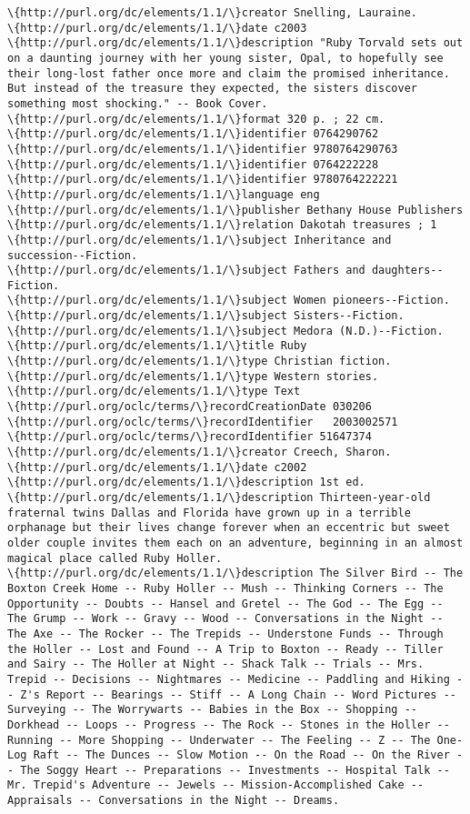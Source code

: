 \documentclass[11pt]{article}
\begin{document}
    \begin{Verbatim}[commandchars=\\\{\}]
\{http://purl.org/dc/elements/1.1/\}creator Snelling, Lauraine.
\{http://purl.org/dc/elements/1.1/\}date c2003
\{http://purl.org/dc/elements/1.1/\}description "Ruby Torvald sets out on a daunting journey with her young sister, Opal, to hopefully see their long-lost father once more and claim the promised inheritance. But instead of the treasure they expected, the sisters discover something most shocking." -- Book Cover.
\{http://purl.org/dc/elements/1.1/\}format 320 p. ; 22 cm.
\{http://purl.org/dc/elements/1.1/\}identifier 0764290762
\{http://purl.org/dc/elements/1.1/\}identifier 9780764290763
\{http://purl.org/dc/elements/1.1/\}identifier 0764222228
\{http://purl.org/dc/elements/1.1/\}identifier 9780764222221
\{http://purl.org/dc/elements/1.1/\}language eng
\{http://purl.org/dc/elements/1.1/\}publisher Bethany House Publishers
\{http://purl.org/dc/elements/1.1/\}relation Dakotah treasures ; 1
\{http://purl.org/dc/elements/1.1/\}subject Inheritance and succession--Fiction.
\{http://purl.org/dc/elements/1.1/\}subject Fathers and daughters--Fiction.
\{http://purl.org/dc/elements/1.1/\}subject Women pioneers--Fiction.
\{http://purl.org/dc/elements/1.1/\}subject Sisters--Fiction.
\{http://purl.org/dc/elements/1.1/\}subject Medora (N.D.)--Fiction.
\{http://purl.org/dc/elements/1.1/\}title Ruby 
\{http://purl.org/dc/elements/1.1/\}type Christian fiction.
\{http://purl.org/dc/elements/1.1/\}type Western stories.
\{http://purl.org/dc/elements/1.1/\}type Text
\{http://purl.org/oclc/terms/\}recordCreationDate 030206
\{http://purl.org/oclc/terms/\}recordIdentifier   2003002571
\{http://purl.org/oclc/terms/\}recordIdentifier 51647374
\{http://purl.org/dc/elements/1.1/\}creator Creech, Sharon.
\{http://purl.org/dc/elements/1.1/\}date c2002
\{http://purl.org/dc/elements/1.1/\}description 1st ed.
\{http://purl.org/dc/elements/1.1/\}description Thirteen-year-old fraternal twins Dallas and Florida have grown up in a terrible orphanage but their lives change forever when an eccentric but sweet older couple invites them each on an adventure, beginning in an almost magical place called Ruby Holler.
\{http://purl.org/dc/elements/1.1/\}description The Silver Bird -- The Boxton Creek Home -- Ruby Holler -- Mush -- Thinking Corners -- The Opportunity -- Doubts -- Hansel and Gretel -- The God -- The Egg -- The Grump -- Work -- Gravy -- Wood -- Conversations in the Night -- The Axe -- The Rocker -- The Trepids -- Understone Funds -- Through the Holler -- Lost and Found -- A Trip to Boxton -- Ready -- Tiller and Sairy -- The Holler at Night -- Shack Talk -- Trials -- Mrs. Trepid -- Decisions -- Nightmares -- Medicine -- Paddling and Hiking -- Z's Report -- Bearings -- Stiff -- A Long Chain -- Word Pictures -- Surveying -- The Worrywarts -- Babies in the Box -- Shopping -- Dorkhead -- Loops -- Progress -- The Rock -- Stones in the Holler -- Running -- More Shopping -- Underwater -- The Feeling -- Z -- The One-Log Raft -- The Dunces -- Slow Motion -- On the Road -- On the River -- The Soggy Heart -- Preparations -- Investments -- Hospital Talk -- Mr. Trepid's Adventure -- Jewels -- Mission-Accomplished Cake -- Appraisals -- Conversations in the Night -- Dreams.

\end{Verbatim}
\end{document}
